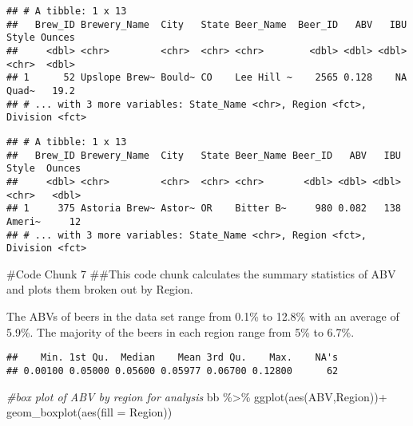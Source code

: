 \documentclass[
]{article}
\newenvironment{Shaded}{\begin{snugshade}}{\end{snugshade}}
\newcommand{\AttributeTok}[1]{\textcolor[rgb]{0.77,0.63,0.00}{#1}}
\newcommand{\CommentTok}[1]{\textcolor[rgb]{0.56,0.35,0.01}{\textit{#1}}}
\newcommand{\FunctionTok}[1]{\textcolor[rgb]{0.00,0.00,0.00}{#1}}
\newcommand{\NormalTok}[1]{#1}
\newcommand{\SpecialCharTok}[1]{\textcolor[rgb]{0.00,0.00,0.00}{#1}}
\begin{document}
\begin{verbatim}
## # A tibble: 1 x 13
##   Brew_ID Brewery_Name  City   State Beer_Name  Beer_ID   ABV   IBU Style Ounces
##     <dbl> <chr>         <chr>  <chr> <chr>        <dbl> <dbl> <dbl> <chr>  <dbl>
## 1      52 Upslope Brew~ Bould~ CO    Lee Hill ~    2565 0.128    NA Quad~   19.2
## # ... with 3 more variables: State_Name <chr>, Region <fct>, Division <fct>
\end{verbatim}

\begin{Shaded}
\end{Shaded}

\begin{verbatim}
## # A tibble: 1 x 13
##   Brew_ID Brewery_Name  City   State Beer_Name Beer_ID   ABV   IBU Style  Ounces
##     <dbl> <chr>         <chr>  <chr> <chr>       <dbl> <dbl> <dbl> <chr>   <dbl>
## 1     375 Astoria Brew~ Astor~ OR    Bitter B~     980 0.082   138 Ameri~     12
## # ... with 3 more variables: State_Name <chr>, Region <fct>, Division <fct>
\end{verbatim}

\#Code Chunk 7 \#\#This code chunk calculates the summary statistics of
ABV and plots them broken out by Region.

The ABVs of beers in the data set range from 0.1\% to 12.8\% with an
average of 5.9\%. The majority of the beers in each region range from
5\% to 6.7\%.

\begin{Shaded}
\end{Shaded}

\begin{verbatim}
##    Min. 1st Qu.  Median    Mean 3rd Qu.    Max.    NA's 
## 0.00100 0.05000 0.05600 0.05977 0.06700 0.12800      62
\end{verbatim}

\begin{Shaded}
\begin{Highlighting}[]
\CommentTok{\#box plot of ABV by region for analysis}
\NormalTok{bb }\SpecialCharTok{\%\textgreater{}\%}
   \FunctionTok{ggplot}\NormalTok{(}\FunctionTok{aes}\NormalTok{(ABV,Region))}\SpecialCharTok{+}
   \FunctionTok{geom\_boxplot}\NormalTok{(}\FunctionTok{aes}\NormalTok{(}\AttributeTok{fill =}\NormalTok{ Region))}
\end{Highlighting}
\end{Shaded}
\end{document}
